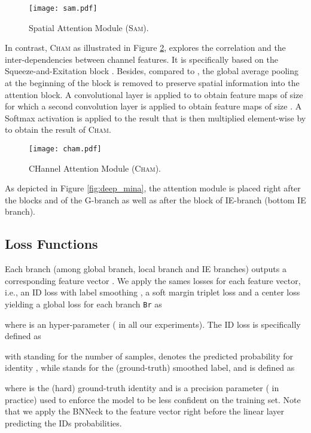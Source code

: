 \documentclass[final]{cvpr}
\begin{document}
\begin{figure}[h!]
  \centering
  \texttt{[image: sam.pdf]}
\caption{Spatial Attention Module (\textsc{Sam}). }
\label{fig:sam}
\end{figure}




In contrast, \textsc{Cham} as illustrated in Figure \ref{fig:cham}, explores the correlation and the inter-dependencies between
channel features. It is specifically based on the Squeeze-and-Exitation block \cite{hu2018squeeze}. Besides, compared to \cite{hu2018squeeze}, the global average pooling at the beginning of the block is removed to preserve spatial information into the attention block. A convolutional layer is applied to  to obtain feature maps of size  for which a second convolution layer is applied to obtain feature maps of size . A Softmax activation is applied to the result that is then multiplied element-wise by  to obtain the result of \textsc{Cham}.

\begin{figure}[h!]
  \centering
  \texttt{[image: cham.pdf]}
\caption{CHannel Attention Module (\textsc{Cham}).}
\label{fig:cham}
\end{figure}

As depicted in Figure \ref{fig:deep_mina}, the attention module is placed right after the blocks  and  of the G-branch as well as after the block  of IE-branch  (bottom IE branch).






\subsection{Loss Functions}

Each branch  (among global branch, local branch and IE branches) outputs a corresponding feature vector . We apply the sames losses for each feature vector, i.e., an ID loss with label smoothing , a soft margin triplet loss  and a center loss   yielding a global loss for each branch \texttt{Br} as 

where  is an hyper-parameter ( in all our experiments). The ID loss is specifically defined as

with  standing for the number of samples,  denotes the predicted probability for identity , while  stands for the (ground-truth) smoothed label, and is defined as 

where  is the (hard) ground-truth identity and  is a precision parameter ( in practice) used to enforce the model to be less confident on the training set. Note that we apply the BNNeck \cite{luo2019bag} to the feature vector  right before the linear layer predicting the IDs probabilities.  
\end{document}
